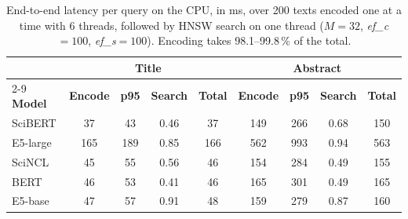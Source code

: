 \begin{table}[tbp]
\caption{End-to-end latency per query on the CPU, in ms, over 200 texts encoded one at a time with 6 threads, followed by HNSW search on one thread ($M=32$, \textit{ef\_c}$=100$, \textit{ef\_s}$=100$). Encoding takes 98.1--99.8\,\% of the total.}\label{tab:e2e}
\centering
\small
\begin{tabular}{|l|c|c|c|c|c|c|c|c|}
\hline
 & \multicolumn{4}{c|}{\textbf{Title}} & \multicolumn{4}{c|}{\textbf{Abstract}} \\ \cline{2-9}
\textbf{Model} & \textbf{Encode} & \textbf{p95} & \textbf{Search} & \textbf{Total} & \textbf{Encode} & \textbf{p95} & \textbf{Search} & \textbf{Total} \\
\hline
SciBERT & 37 & 43 & 0.46 & 37 & 149 & 266 & 0.68 & 150 \\
E5-large & 165 & 189 & 0.85 & 166 & 562 & 993 & 0.94 & 563 \\
SciNCL & 45 & 55 & 0.56 & 46 & 154 & 284 & 0.49 & 155 \\
BERT & 46 & 53 & 0.41 & 46 & 165 & 301 & 0.49 & 165 \\
E5-base & 47 & 57 & 0.91 & 48 & 159 & 279 & 0.87 & 160 \\
\hline
\end{tabular}
\end{table}
